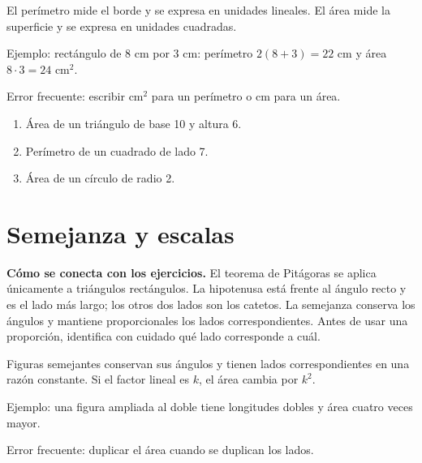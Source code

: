 \documentclass[10pt,oneside,openany]{book}
\begin{document}
El perímetro mide el borde y se expresa en unidades lineales. El área mide la superficie y se expresa en unidades cuadradas.

\begin{ejemplo}
Ejemplo: rectángulo de 8 cm por 3 cm: perímetro $2(8+3)=22$ cm y área $8\cdot3=24$ cm$^2$.
\end{ejemplo}

\begin{ojo}
Error frecuente: escribir cm$^2$ para un perímetro o cm para un área.
\end{ojo}

\begin{practica}

\begin{enumerate}

\item Área de un triángulo de base 10 y altura 6.

\item Perímetro de un cuadrado de lado 7.

\item Área de un círculo de radio 2.

\end{enumerate}

\end{practica}



\section{Semejanza y escalas}

\textbf{Cómo se conecta con los ejercicios.} El teorema de Pitágoras se aplica únicamente a triángulos rectángulos. La hipotenusa está frente al ángulo recto y es el lado más largo; los otros dos lados son los catetos. La semejanza conserva los ángulos y mantiene proporcionales los lados correspondientes. Antes de usar una proporción, identifica con cuidado qué lado corresponde a cuál.

Figuras semejantes conservan sus ángulos y tienen lados correspondientes en una razón constante. Si el factor lineal es $k$, el área cambia por $k^2$.

\begin{ejemplo}
Ejemplo: una figura ampliada al doble tiene longitudes dobles y área cuatro veces mayor.
\end{ejemplo}

\begin{ojo}
Error frecuente: duplicar el área cuando se duplican los lados.
\end{ojo}
\end{document}
